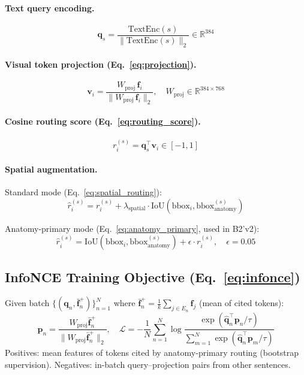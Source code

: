 \documentclass[11pt,a4paper]{article}
\newcommand{\RR}{\mathbb{R}}
\begin{document}
\paragraph{Text query encoding.}
\begin{equation}
\mathbf{q}_s = \frac{\mathrm{TextEnc}(s)}{\lVert \mathrm{TextEnc}(s) \rVert_2} \in \RR^{384}
\end{equation}

\paragraph{Visual token projection (Eq.~\ref{eq:projection}).}
\begin{equation}
\mathbf{v}_i = \frac{W_{\mathrm{proj}} \, \mathbf{f}_i}{\lVert W_{\mathrm{proj}} \, \mathbf{f}_i\rVert_2}, \quad W_{\mathrm{proj}} \in \RR^{384 \times 768}
\end{equation}

\paragraph{Cosine routing score (Eq.~\ref{eq:routing_score}).}
\begin{equation}
r_i^{(s)} = \mathbf{q}_s^\top \mathbf{v}_i \in [-1, 1]
\end{equation}

\paragraph{Spatial augmentation.}

Standard mode (Eq.~\ref{eq:spatial_routing}):
\begin{equation}
\hat{r}_i^{(s)} = r_i^{(s)} + \lambda_{\mathrm{spatial}} \cdot \mathrm{IoU}(\mathrm{bbox}_i, \mathrm{bbox}_{\mathrm{anatomy}}^{(s)})
\end{equation}

Anatomy-primary mode (Eq.~\ref{eq:anatomy_primary}, used in B2'v2):
\begin{equation}
\hat{r}_i^{(s)} = \mathrm{IoU}(\mathrm{bbox}_i, \mathrm{bbox}_{\mathrm{anatomy}}^{(s)}) + \epsilon \cdot r_i^{(s)}, \quad \epsilon = 0.05
\end{equation}

\subsection{InfoNCE Training Objective (Eq.~\ref{eq:infonce})}

Given batch $\{(\mathbf{q}_n, \bar{\mathbf{f}}_n^{+})\}_{n=1}^N$ where $\bar{\mathbf{f}}_n^{+} = \frac{1}{k}\sum_{j \in E_n} \mathbf{f}_j$ (mean of cited tokens):
\begin{equation}
\mathbf{p}_n = \frac{W_{\mathrm{proj}} \bar{\mathbf{f}}_n^{+}}{\lVert W_{\mathrm{proj}} \bar{\mathbf{f}}_n^{+} \rVert_2}, \quad
\mathcal{L} = -\frac{1}{N} \sum_{n=1}^{N} \log \frac{\exp(\hat{\mathbf{q}}_n^\top \mathbf{p}_n / \tau)}{\sum_{m=1}^{N} \exp(\hat{\mathbf{q}}_n^\top \mathbf{p}_m / \tau)}
\end{equation}
Positives: mean features of tokens cited by anatomy-primary routing (bootstrap supervision).
Negatives: in-batch query--projection pairs from other sentences.
\end{document}
